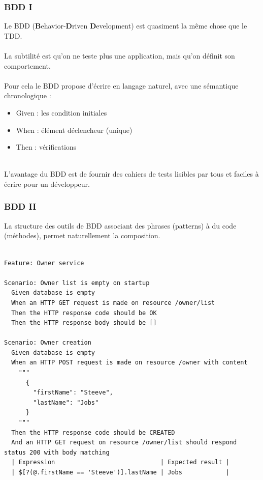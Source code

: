 \begin{frame}
	\frametitle{BDD I}
    Le BDD (\textbf{B}ehavior-\textbf{D}riven \textbf{D}evelopment) est quasiment la m\^{e}me chose que le TDD.
    \\~\\
    La subtilit\'{e} est qu'on ne teste plus une application, mais qu'on d\'{e}finit son comportement.
    \\~\\
    Pour cela le BDD propose d'\'{e}crire en langage naturel, avec une s\'{e}mantique chronologique :
    \begin{itemize}
    	\item Given : les condition initiales
        \item When : \'{e}l\'{e}ment d\'{e}clencheur (unique)
        \item Then : v\'{e}rifications
    \end{itemize}
	~\\
	L'avantage du BDD est de fournir des cahiers de tests lisibles par tous et faciles \`{a} \'{e}crire pour un d\'{e}veloppeur.
\end{frame}

\begin{frame}[fragile]
	\frametitle{BDD II}
    La structure des outils de BDD associant des phrases (patterns) \`{a} du code (m\'{e}thodes), permet naturellement la composition.
    \\~\\
    \begin{lstlisting}[basicstyle=\tiny]
Feature: Owner service

Scenario: Owner list is empty on startup
  Given database is empty
  When an HTTP GET request is made on resource /owner/list
  Then the HTTP response code should be OK
  Then the HTTP response body should be []

Scenario: Owner creation
  Given database is empty
  When an HTTP POST request is made on resource /owner with content
    """
      {
      	"firstName": "Steeve",
      	"lastName": "Jobs"
      }
    """
  Then the HTTP response code should be CREATED
  And an HTTP GET request on resource /owner/list should respond status 200 with body matching
  | Expression                             | Expected result |
  | $[?(@.firstName == 'Steeve')].lastName | Jobs            |
	\end{lstlisting}
\end{frame}

